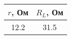 \begin{tabular}{cc}
\toprule
$r$, Ом & $R_L$, Ом \\
\midrule
12.2 & 31.5 \\
\bottomrule
\end{tabular}

